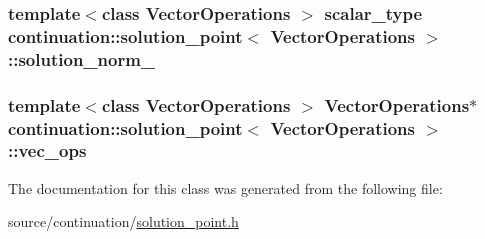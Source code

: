 \hypertarget{classcontinuation_1_1solution__point_a1273d8cd06c0249e3e2ed6c174125d35}{
\subsubsection[{solution\-\_\-norm\-\_\-2}]{\setlength{\rightskip}{0pt plus 5cm}template$<$class Vector\-Operations $>$ {\bf scalar\-\_\-type} {\bf continuation\-::solution\-\_\-point}$<$ Vector\-Operations $>$\-::solution\-\_\-norm\-\_\hspace{0.3cm}{\ttfamily [protected]}}}\label{classcontinuation_1_1solution__point_a1273d8cd06c0249e3e2ed6c174125d35}
\hypertarget{classcontinuation_1_1solution__point_a624bdfc528e737f6baf4529dd61c2885}{
\subsubsection[{vec\-\_\-ops}]{\setlength{\rightskip}{0pt plus 5cm}template$<$class Vector\-Operations $>$ Vector\-Operations$\ast$ {\bf continuation\-::solution\-\_\-point}$<$ Vector\-Operations $>$\-::vec\-\_\-ops\hspace{0.3cm}{\ttfamily [protected]}}}\label{classcontinuation_1_1solution__point_a624bdfc528e737f6baf4529dd61c2885}


The documentation for this class was generated from the following file\-:\begin{DoxyCompactItemize}
\item 
source/continuation/\hyperlink{solution__point_8h}{solution\-\_\-point.\-h}\end{DoxyCompactItemize}
